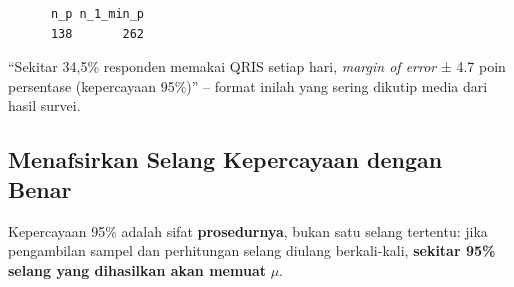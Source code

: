 \documentclass[
  indonesian,
  letterpaper,
]{book}
\begin{document}
\begin{verbatim}
      n_p n_1_min_p 
      138       262 
\end{verbatim}

``Sekitar 34,5\% responden memakai QRIS setiap hari, \emph{margin of
error} ± 4.7 poin persentase (kepercayaan 95\%)'' -- format inilah yang
sering dikutip media dari hasil survei.

\subsection{Menafsirkan Selang Kepercayaan dengan
Benar}\label{menafsirkan-selang-kepercayaan-dengan-benar}

Kepercayaan 95\% adalah sifat \textbf{prosedurnya}, bukan satu selang
tertentu: jika pengambilan sampel dan perhitungan selang diulang
berkali-kali, \textbf{sekitar 95\% selang yang dihasilkan akan memuat}
\(\mu\).
\end{document}
